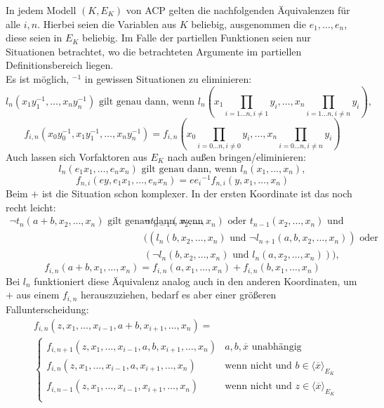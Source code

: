     \begin{fact}\label{Eliminierungsregeln}
    	In jedem Modell $(K,E_K)$ von ACP gelten die nachfolgenden Äquivalenzen für alle $i,n$. Hierbei seien die Variablen aus $K$ beliebig, ausgenommen die $e_1,\dots,e_n$, diese seien in $E_K$ beliebig. Im Falle der partiellen Funktionen seien nur Situationen betrachtet, wo die betrachteten Argumente im partiellen Definitionsbereich liegen.\\
    	Es ist möglich, \glqq{}$^{-1}$\grqq{} in gewissen Situationen zu eliminieren:
    	$$l_n(x_1y_1^{-1},\dots,x_ny_n^{-1})\text{ gilt genau dann, wenn }l_n\left(x_1\prod\limits_{i=1\dots n,i\neq 1}y_i,\dots,x_n\prod\limits_{i=1\dots n,i\neq n}y_i\right),$$
    	$$f_{i,n}(x_0y_0^{-1},x_1y_1^{-1},\dots,x_ny_n^{-1})= f_{i,n}\left(x_0\prod\limits_{i=0\dots n,i\neq 0}y_i,\dots,x_n\prod\limits_{i=0\dots n,i\neq n}y_i\right)$$
    	Auch lassen sich Vorfaktoren aus $E_K$ nach außen bringen/eliminieren:
    	$$l_n(e_1x_1,\dots,e_nx_n)\text{ gilt genau dann, wenn }l_n(x_1,\dots,x_n),$$
    	$$f_{n,i}(ey,e_1x_1,\dots,e_nx_n)=e{e_i}^{-1}f_{n,i}(y,x_1,\dots,x_n)$$
    	Beim \glqq{}$+$\grqq{} ist die Situation schon komplexer. In der ersten Koordinate ist das noch recht leicht:
    	\begin{align*}
    	\neg t_n(a+b,x_2,\dots,x_n)\text{ gilt genau dann, wenn }&\neg t_{n-1}(x_2,\dots,x_n)\text{ oder }t_{n-1}(x_2,\dots,x_n)\text{ und }\\&((l_n(b,x_2,\dots,x_n)\text{ und }\neg l_{n+1}(a,b,x_2,\dots,x_n))\text{ oder }\\&(\neg l_n(b,x_2,\dots,x_n)\text{ und }l_n(a,x_2,\dots,x_n))),
    	\end{align*}
    	$$f_{i,n}(a+b,x_1,\dots,x_n)=f_{i,n}(a,x_1,\dots,x_n)+f_{i,n}(b,x_1,\dots,x_n)$$\newpage
    	Bei $l_n$ funktioniert diese Äquivalenz analog auch in den anderen Koordinaten, um \glqq{}$+$\grqq{} aus einem $f_{i,n}$ herauszuziehen, bedarf es aber einer größeren Fallunterscheidung:
    	\begin{align*}
    	&f_{i,n}(z,x_1,\dots,x_{i-1},a+b,x_{i+1},\dots,x_n)=\\
    	&\left\{\begin{array}{ll}
    	f_{i,n+1}(z,x_1,\dots,x_{i-1},a,b,x_{i+1},\dots,x_n)& a,b,\overline{x}\text{ unabhängig}\\
    	f_{i,n}(z,x_1,\dots,x_{i-1},a,x_{i+1},\dots,x_n)&\text{wenn nicht und }b\in\langle\overline{x}\rangle_{E_K}\\
    	f_{i,n-1}(z,x_1,\dots,x_{i-1},x_{i+1},\dots,x_n)&\text{wenn nicht und }z\in\langle\overline{x}\rangle_{E_K}\\

\end{array}
\end{align*}
\end{fact}
